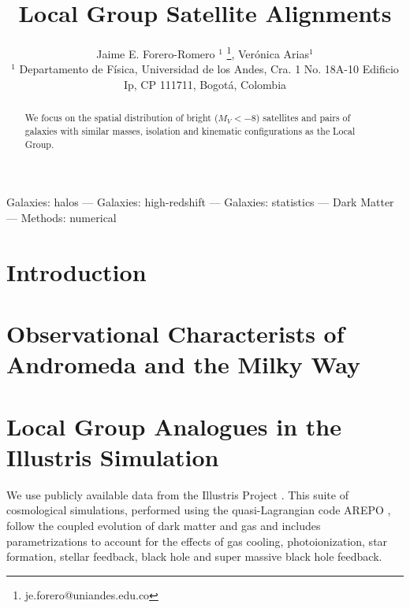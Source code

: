 \documentclass[a4paper,fleqn,usenatbib]{mnras}
\begin{document}
\title[LG satellite alignments]{Local Group Satellite Alignments}
\author[J.E. Forero-Romero \& V. Arias]
{Jaime E. Forero-Romero $^{1}$ \thanks{je.forero@uniandes.edu.co},
Ver\'onica Arias$^1$\\
$^1$ Departamento de F\'isica, Universidad de los Andes, Cra. 1
  No. 18A-10 Edificio Ip, CP 111711, Bogot\'a, Colombia \\
}

\maketitle

\begin{abstract}
We focus on the spatial distribution of bright ($M_V<-8$) satellites and
pairs of galaxies with similar masses, isolation and kinematic
configurations as the Local Group. 
\end{abstract}

\begin{keywords}Galaxies: halos --- Galaxies: high-redshift --- Galaxies: statistics
--- Dark Matter --- Methods: numerical 
\end{keywords}

\section{Introduction}

\section{Observational Characterists of Andromeda and the Milky Way}
\label{sec:obs}


\section{Local Group Analogues in the Illustris Simulation}
\label{sec:NumericalSetup}

We use publicly available data from the Illustris Project 
\citep{2014MNRAS.444.1518V}. 
This suite of cosmological simulations, performed using the quasi-Lagrangian
code AREPO \citep{2010MNRAS.401..791S}, follow the coupled evolution of dark 
matter and gas and includes parametrizations to account for the effects of
gas cooling, photoionization, star formation, stellar feedback, black
hole and super massive black hole feedback. 
\end{document}
